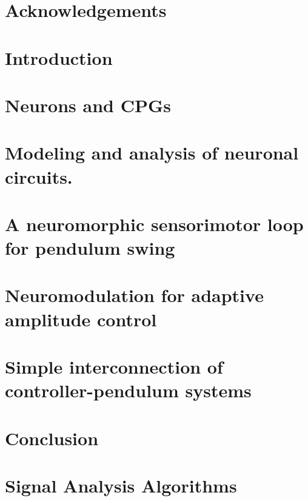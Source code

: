 \documentclass[12pt, twoside]{report}
\newcommand{\mychaptername}{Undefined}
\newcommand{\mychapterdesignation}{Chapter}
\newcommand{\mychapter}[1]{\chapter{#1}\renewcommand{\mychaptername}{\mychapterdesignation~\thechapter : #1}}
\begin{document}
    
    \newpage 
    \thispagestyle{empty}
    \mbox{}
    \newpage
    

    
    
    \renewcommand{\mychaptername}{Abstract} %
    
    \chapter*{Acknowledgements} %
    
    \renewcommand{\mychaptername}{Acknowledgements}
    
    \newpage
    \renewcommand{\mychaptername}{Contents}
    \tableofcontents
    
    \mychapter{Introduction}
    
    \mychapter{Neurons and CPGs}
    
    \mychapter{Modeling and analysis of neuronal circuits.}
    

    \mychapter{A neuromorphic sensorimotor loop for pendulum swing}
    

    \mychapter{Neuromodulation for adaptive amplitude control}
    

    \mychapter{Simple interconnection of controller-pendulum systems}
    

    \mychapter{Conclusion}
    
    \newpage
    \renewcommand{\mychaptername}{Bibliography}
    
    
    
    \newpage
    \appendix
    \renewcommand{\mychapterdesignation}{Appendix}
    \mychapter{Signal Analysis Algorithms}
    
\end{document}
